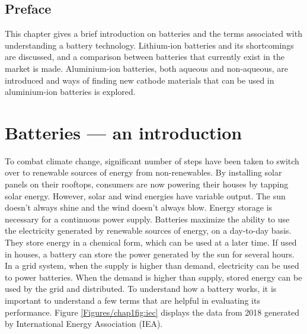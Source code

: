 
\section*{\centering Preface}
This chapter gives a brief introduction on batteries and the terms associated with understanding a battery technology. Lithium-ion batteries and its shortcomings are discussed, and a comparison between batteries that currently exist in the market is made. Aluminium-ion batteries, both aqueous and non-aqueous, are introduced and ways of finding new cathode materials that can be used in aluminium-ion batteries is explored.
\newpage
\chapter{Batteries --- an introduction} %
 \label{chap1} %
\newcommand{\keyword}[1]{\textbf{#1}}
\newcommand{\tabhead}[1]{\textbf{#1}}
\newcommand{\code}[1]{\texttt{#1}}
\newcommand{\file}[1]{\texttt{\bfseries#1}}
\newcommand{\option}[1]{\texttt{\itshape#1}}

To combat climate change, significant number of steps have been taken to switch over to renewable sources of energy from non-renewables. By installing solar panels on their rooftops, consumers are now powering their houses by tapping solar energy. However, solar and wind energies have variable output. The sun doesn't always shine and the wind doesn't always blow. Energy storage is necessary for a continuous power supply. Batteries maximize the ability to use the electricity generated by renewable sources of energy, on a day-to-day basis. They store energy in a chemical form, which can be used at a later time. If used in houses, a battery can store the power generated by the sun for several hours. In a grid system, when the supply is higher than demand, electricity can be used to power batteries. When the demand is higher than supply, stored energy can be used by the grid and distributed. To understand how a battery works, it is important to understand a few terms that are helpful in evaluating its performance. Figure \ref{Figures/chap1fig:iec} displays the data from 2018 generated by International Energy Association (IEA). 

